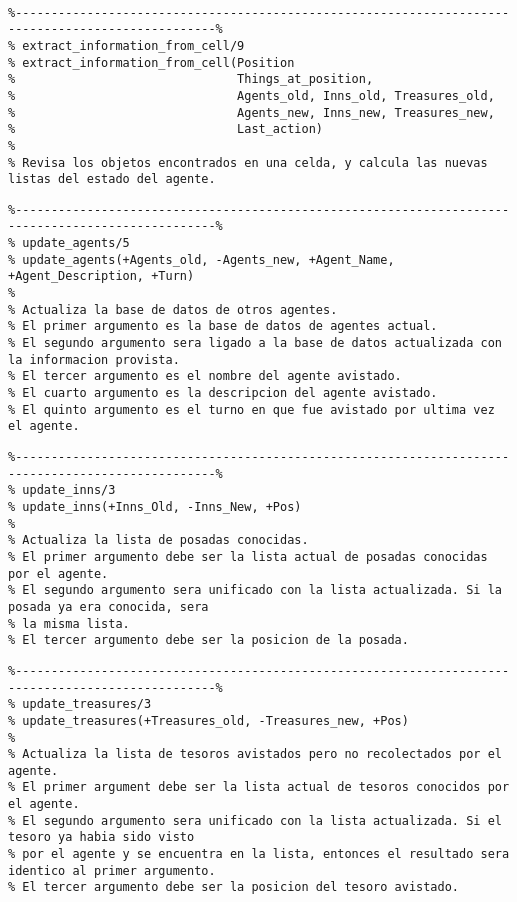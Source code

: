 \documentclass[a4paper,12pt]{report}
\begin{document}
\ 

\begin{scriptsize}
\begin{verbatim}
%--------------------------------------------------------------------------------------------------%
% extract_information_from_cell/9
% extract_information_from_cell(Position
%                               Things_at_position,
%                               Agents_old, Inns_old, Treasures_old,
%                               Agents_new, Inns_new, Treasures_new,
%                               Last_action)
%
% Revisa los objetos encontrados en una celda, y calcula las nuevas listas del estado del agente.
\end{verbatim}
\end{scriptsize}

\begin{scriptsize}
\begin{verbatim}
%--------------------------------------------------------------------------------------------------%
% update_agents/5
% update_agents(+Agents_old, -Agents_new, +Agent_Name, +Agent_Description, +Turn)
%
% Actualiza la base de datos de otros agentes. 
% El primer argumento es la base de datos de agentes actual.
% El segundo argumento sera ligado a la base de datos actualizada con la informacion provista.
% El tercer argumento es el nombre del agente avistado.
% El cuarto argumento es la descripcion del agente avistado.
% El quinto argumento es el turno en que fue avistado por ultima vez el agente.
\end{verbatim}
\end{scriptsize}

\begin{scriptsize}
\begin{verbatim}
%--------------------------------------------------------------------------------------------------%
% update_inns/3
% update_inns(+Inns_Old, -Inns_New, +Pos)
%
% Actualiza la lista de posadas conocidas. 
% El primer argumento debe ser la lista actual de posadas conocidas por el agente. 
% El segundo argumento sera unificado con la lista actualizada. Si la posada ya era conocida, sera
% la misma lista. 
% El tercer argumento debe ser la posicion de la posada.
\end{verbatim}
\end{scriptsize}

\begin{scriptsize}
\begin{verbatim}
%--------------------------------------------------------------------------------------------------%
% update_treasures/3
% update_treasures(+Treasures_old, -Treasures_new, +Pos)
% 
% Actualiza la lista de tesoros avistados pero no recolectados por el agente. 
% El primer argument debe ser la lista actual de tesoros conocidos por el agente. 
% El segundo argumento sera unificado con la lista actualizada. Si el tesoro ya habia sido visto
% por el agente y se encuentra en la lista, entonces el resultado sera identico al primer argumento.
% El tercer argumento debe ser la posicion del tesoro avistado.
\end{verbatim}
\end{scriptsize}
\end{document}
